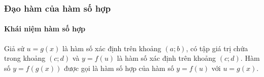 \subsubsection{Đạo hàm của hàm số hợp}
\paragraph{Khái niệm hàm số hợp}
\begin{dl}
	Giả sử $u=g(x)$ là hàm số xác định trên khoảng $(a;b)$, có tập giá trị chứa trong khoảng $(c;d)$ và $y=f(u)$ là hàm số xác định trên khoảng $(c;d)$. Hàm số $y=f(g(x))$ được gọi là hàm số hợp của hàm số $y=f(u)$ với $u=g(x)$.
\end{dl}
